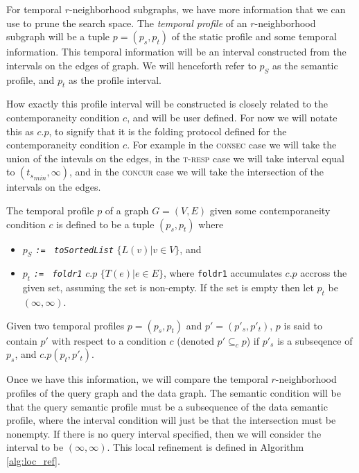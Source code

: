 For temporal $r$-neighborhood subgraphs, we have more information that we can
use to prune the search space. The \textit{temporal profile} of an
$r$-neighborhood subgraph will be a tuple $p = (p_s,p_t)$ of the static profile and
some temporal information. This temporal information will be an interval
constructed from the intervals on the edges of graph. We will henceforth refer
to $p_S$ as the semantic profile, and $p_t$ as the profile interval.

How exactly this profile interval will be constructed is closely related to the
contemporaneity condition $c$, and will be user defined.  For now we will notate
this as $c.p$, to signify that it is the folding protocol defined for the
contemporaneity condition $c$. For example in the \textsc{consec} case we will
take the union of the intevals on the edges, in the \textsc{t-resp} case we will
take interval equal to $({t_s}_{min}, \infty)$, and in the \textsc{concur} case
we will take the intersection of the intervals on the edges.

\begin{defn}
  The temporal profile $p$ of a graph $G = (V,E)$ given some contemporaneity condition
  $c$ is defined to be a tuple $(p_s, p_t)$ where
  \begin{itemize}
  \item $p_S$ \emph{\texttt{:=} \, \texttt{toSortedList}} \; $\{L(v) | v \in V \}$,
    and
  \item $p_t$ \emph{\texttt{:=} \, \texttt{foldr1}} \; $c.p$ \; $\{T(e) | e \in E\}$, where
    \texttt{foldr1} accumulates $c.p$ accross the  given set, assuming the set
    is non-empty. If the set is empty then let $p_t$ be $(\infty,\infty)$.
  \end{itemize}

  Given two temporal profiles $p = (p_s, p_t)$ and $p' = (p'_s, p'_t)$, $p$ is
  said to contain $p'$ with respect to a condition $c$ (denoted $p' \subseteq_c
  p$) if $p'_s$ is a subseqence of $p_s$, and $c.p(p_t, p'_t)$.
\end{defn}


Once we have this information, we will compare the temporal $r$-neighborhood
profiles of the query graph and the data graph. The semantic condition will be
that the query semantic profile must be a subsequence of the data semantic
profile, where the interval condition will just be that the intersection must be
nonempty.  If there is no query interval specified, then we will consider the
interval to be $(\infty, \infty)$. This local refinement is defined in Algorithm
\ref{alg:loc_ref}.

